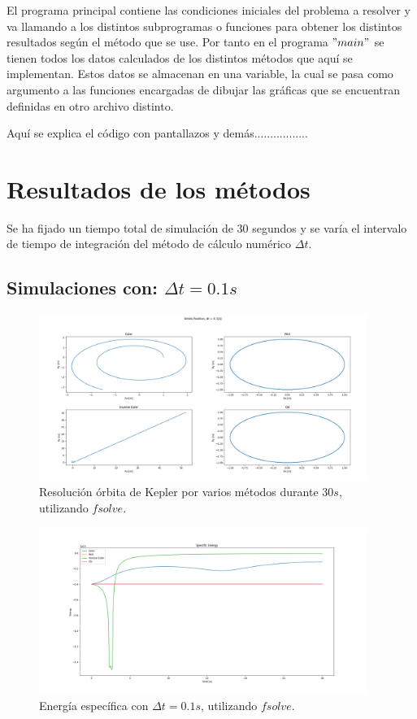 \documentclass[12pt,a4paper]{article}
\begin{document}
El programa principal contiene las condiciones iniciales del problema a resolver y va llamando a los distintos subprogramas o funciones para obtener los distintos resultados según el método que se use. Por tanto en el programa $"main"$ se tienen todos los datos calculados de los distintos métodos que aquí se implementan. Estos datos se almacenan en una variable, la cual se pasa como argumento a las funciones encargadas de dibujar las gráficas que se encuentran definidas en otro archivo distinto.


Aquí se explica el código con pantallazos y demás.................

\section{Resultados de los métodos}
Se ha fijado un tiempo total de simulación de 30 segundos y se varía el intervalo de tiempo de integración del método de cálculo numérico $\Delta t$.
\subsection{Simulaciones con: $\Delta t = 0.1 s$}

\begin{figure}[H] 
	\centering
	\includegraphics[width=0.95\textwidth]{FIGURES/dt0.1_fsolve_pos.png}
	\caption{Resolución órbita de Kepler por varios métodos durante 30$s$, utilizando $fsolve$.}
\end{figure}
\begin{figure}[H] 
	\centering
	\includegraphics[width=0.95\textwidth]{FIGURES/dt0.1_fsolve_energy.png}
	\caption{Energía específica con $\Delta t = 0.1 s$, utilizando $fsolve$.}
\end{figure}
\end{document}
